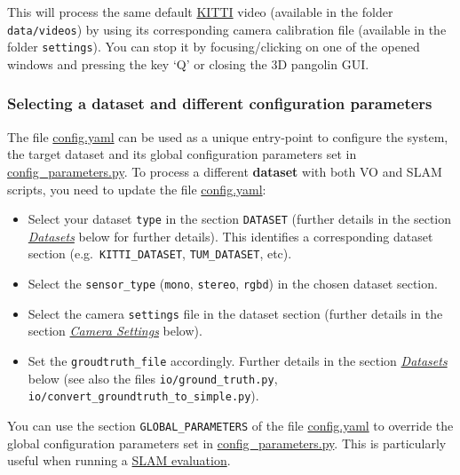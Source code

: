 \documentclass{article}
\begin{document}
This will process the same default
\href{(http://www.cvlibs.net/datasets/kitti/eval_odometry.php)}{KITTI}
video (available in the folder \texttt{data/videos}) by using its
corresponding camera calibration file (available in the folder
\texttt{settings}). You can stop it by focusing/clicking on one of the
opened windows and pressing the key `Q' or closing the 3D pangolin GUI.
\hypertarget{selecting-a-dataset-and-different-configuration-parameters}{%
\subsubsection{Selecting a dataset and different configuration
parameters}\label{selecting-a-dataset-and-different-configuration-parameters}}

The file \href{./config.yaml}{config.yaml} can be used as a unique
entry-point to configure the system, the target dataset and its global
configuration parameters set in
\href{./config_parameters.py}{config\_parameters.py}.
To process a different \textbf{dataset} with both VO and SLAM scripts,
you need to update the file \href{./config.yaml}{config.yaml}:
\begin{itemize}
\item Select
your dataset \texttt{type} in the section \texttt{DATASET} (further
details in the section \emph{\protect\hyperlink{datasets}{Datasets}}
below for further details). This identifies a corresponding dataset
section (e.g.~\texttt{KITTI\_DATASET}, \texttt{TUM\_DATASET}, etc). 
\item  Select the \texttt{sensor\_type} (\texttt{mono}, \texttt{stereo},
\texttt{rgbd}) in the chosen dataset section.
\item  Select the camera \texttt{settings} file in the dataset section
(further details in the section
\emph{\protect\hyperlink{camera-settings}{Camera Settings}} below).
\item Set the \texttt{groudtruth\_file} accordingly. Further details in the
section \emph{\protect\hyperlink{datasets}{Datasets}} below (see also
the files \texttt{io/ground\_truth.py},
\texttt{io/convert\_groundtruth\_to\_simple.py}).
\end{itemize}

You can use the section \texttt{GLOBAL\_PARAMETERS} of the file
\href{./config.yaml}{config.yaml} to override the global configuration
parameters set in \href{./config_parameters.py}{config\_parameters.py}.
This is particularly useful when running a
\protect\hyperlink{evaluating-slam}{SLAM evaluation}.
\end{document}
